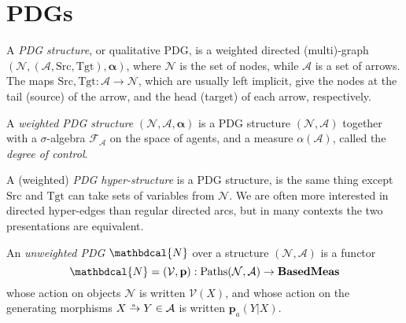 \documentclass[twoside]{article} %
\theoremstyle{plain}
\theoremstyle{definition}
\newcommand{\BaseMeas}{\mathbf{BasedMeas}}
\newcommand{\mat}[1]{\mathbf{#1}}
\newcommand{\V}{\mathcal V}
\newcommand{\N}{\mathcal N}
\newcommand{\Ar}{\mathcal A}
\newcommand{\src}{\mathrm{Src}}
\newcommand{\tgt}{\mathrm{Tgt}}
\newcommand{\balpha}{\boldsymbol\alpha}
\newcommand{\dg}[1]{\mathbdcal{#1}}
\newcommand{\ed}[3]{#2%
    	  \overset{\smash{\mskip-5mu\raisebox{-1pt}{$\scriptscriptstyle
    	        #1$}}}{\rightarrow} #3}
\begin{document}

    \section{PDGs}
    \begin{defn}
        A \emph{PDG structure}, or qualitative PDG, is a weighted directed (multi)-graph $(\N, (\Ar, \src, \tgt), \balpha)$, where $\N$ is the set of nodes, while $\Ar$ is a set of arrows. The maps  $\src, \tgt: \Ar \to \N$, which are usually left implicit, give the nodes at the tail (source) of the arrow, and the head (target) of each arrow, respectively. 
    \end{defn}
    
    
    \begin{defn}
        A \emph{weighted PDG structure} $(\N, \Ar, \balpha)$ is a PDG structure $(\N, \Ar)$ together with a $\sigma$-algebra $\mathcal F_{\!\Ar}$ on the space of agents, and a measure $\alpha(\mathcal A)$, called the \emph{degree of control}.
    \end{defn}
    
    A  (weighted) \emph{PDG hyper-structure} is a PDG structure, is the same thing except $\src$ and $\tgt$ can take sets of variables from $\N$.
    We are often more interested in directed hyper-edges than regular directed arcs, but in many contexts the two presentations are equivalent.
    
    
    
    \begin{defn}
        An \emph{unweighted PDG} $\dg N$ over a structure $(\N, \Ar)$ is a functor
        \[ 
            {\dg N} = (\V, \mat p)  : \mathrm{Paths}(\N, \Ar) \to  \BaseMeas
        \] 
        whose action on objects $\N$ is written $\V(X)$, and whose action on the generating morphisms $\ed aXY \in \Ar$ is written $\mat p_a(Y|X)$.
    \end{defn}   
    
\end{document}
